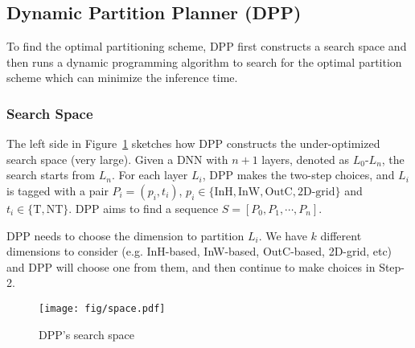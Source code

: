 \subsection{Dynamic Partition Planner (DPP)}
\label{sec:dpp}
To find the optimal partitioning scheme, DPP first constructs a search space and then runs a dynamic programming algorithm to search for the optimal partition scheme which can minimize the inference time.

\subsubsection{Search Space}
The left side in Figure~\ref{space} sketches how DPP constructs the under-optimized search space (very large). Given a DNN with $n+1$ layers, denoted as $L_0$-$L_n$, the search starts from $L_n$. For each layer $L_i$, DPP makes the two-step choices, and $L_i$ is tagged with a pair $P_{i}=(p_i, t_i)$, $p_i\in\{\text{InH}, \text{InW}, \text{OutC}, \text{2D-grid}\}$ and $t_i\in \{\text{T}, \text{NT}\}$. DPP aims to find a sequence $S=[P_0, P_1,\cdots,P_n]$.

 DPP needs to choose the dimension to partition $L_i$. We have $k$ different dimensions to consider (e.g. InH-based, InW-based, OutC-based, 2D-grid, etc) and DPP will choose one from them, and then continue to make choices in Step-2.

\begin{figure*}[!t]
	\centering
	\texttt{[image: fig/space.pdf]}
	\caption{DPP's search space}
	\label{space}
\end{figure*}

